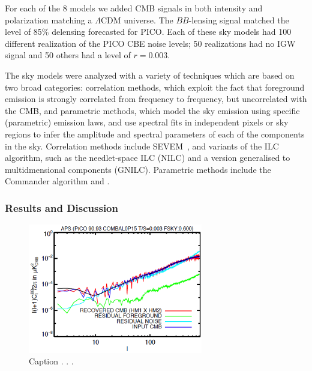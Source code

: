 \documentclass[PICOReport.tex]{subfiles}
\begin{document}
For each of the 8 models we added CMB signals in both intensity and polarization matching a $\Lambda$CDM universe. The $BB$-lensing signal matched the level of 85\% delensing forecasted for PICO. Each of these sky models had 100 different realization of the PICO CBE noise levels; 50 realizations had no \ac{IGW} signal and 50 others had a level of $r=0.003$. 

\vspace{0.1in}
 \hspace{0.1in} The sky models were analyzed with a variety of techniques which are based on two broad categories: correlation methods, which exploit the fact that foreground emission is strongly correlated from frequency to frequency, but uncorrelated with the CMB, and parametric methods, which model the sky emission using specific (parametric) emission laws, and use spectral fits in independent pixels or sky regions to infer the amplitude and spectral parameters of each of the components in the sky. Correlation methods include SEVEM~\citep{sevem}, and variants of the \ac{ILC} algorithm, such as the needlet-space \ac{ILC} (NILC) and a version generalised to multidmensional components (GNILC). Parametric methods include the Commander algorithm and .


\subsubsection{Results and Discussion}

\begin{figure}
\hspace{-0.1in}
\parbox{3.0in}{\centerline {
\includegraphics[width=3.0in]{images/soumen_NILC_foregrounds_93.png}}}
\hspace{0.25in}
\parbox{3.0in}{
\caption{Caption . . . \dotfill
\label{fig:nilc}}}
\vspace{-0.1in}
\end{figure}
\end{document}
